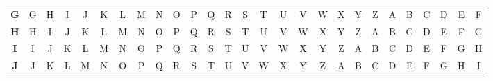 \documentclass{article}
\begin{document}
\begin{latin}
\begin{table}[H]
{\begin{tabular}{ccccccccccccccccccccccccccc}
\multicolumn{1}{c|}{\textbf{G}} & \multicolumn{1}{c|}{G} & \multicolumn{1}{c|}{H} & \multicolumn{1}{c|}{I} & \multicolumn{1}{c|}{J} & \multicolumn{1}{c|}{K} & \multicolumn{1}{c|}{L} & \multicolumn{1}{c|}{M} & \multicolumn{1}{c|}{N} & \multicolumn{1}{c|}{O} & \multicolumn{1}{c|}{P} & \multicolumn{1}{c|}{Q} & \multicolumn{1}{c|}{R} & \multicolumn{1}{c|}{S} & \multicolumn{1}{c|}{T} & \multicolumn{1}{c|}{U} & \multicolumn{1}{c|}{V} & \multicolumn{1}{c|}{W} & \multicolumn{1}{c|}{X} & \multicolumn{1}{c|}{Y} & \multicolumn{1}{c|}{Z} & \multicolumn{1}{c|}{A} & \multicolumn{1}{c|}{B} & \multicolumn{1}{c|}{C} & \multicolumn{1}{c|}{D} & \multicolumn{1}{c|}{E} & \multicolumn{1}{c|}{F} \\ \cline{2-27} 
\multicolumn{1}{c|}{\textbf{H}} & \multicolumn{1}{c|}{H} & \multicolumn{1}{c|}{I} & \multicolumn{1}{c|}{J} & \multicolumn{1}{c|}{K} & \multicolumn{1}{c|}{L} & \multicolumn{1}{c|}{M} & \multicolumn{1}{c|}{N} & \multicolumn{1}{c|}{O} & \multicolumn{1}{c|}{P} & \multicolumn{1}{c|}{Q} & \multicolumn{1}{c|}{R} & \multicolumn{1}{c|}{S} & \multicolumn{1}{c|}{T} & \multicolumn{1}{c|}{U} & \multicolumn{1}{c|}{V} & \multicolumn{1}{c|}{W} & \multicolumn{1}{c|}{X} & \multicolumn{1}{c|}{Y} & \multicolumn{1}{c|}{Z} & \multicolumn{1}{c|}{A} & \multicolumn{1}{c|}{B} & \multicolumn{1}{c|}{C} & \multicolumn{1}{c|}{D} & \multicolumn{1}{c|}{E} & \multicolumn{1}{c|}{F} & \multicolumn{1}{c|}{G} \\ \cline{2-27} 
\multicolumn{1}{c|}{\textbf{I}} & \multicolumn{1}{c|}{I} & \multicolumn{1}{c|}{J} & \multicolumn{1}{c|}{K} & \multicolumn{1}{c|}{L} & \multicolumn{1}{c|}{M} & \multicolumn{1}{c|}{N} & \multicolumn{1}{c|}{O} & \multicolumn{1}{c|}{P} & \multicolumn{1}{c|}{Q} & \multicolumn{1}{c|}{R} & \multicolumn{1}{c|}{S} & \multicolumn{1}{c|}{T} & \multicolumn{1}{c|}{U} & \multicolumn{1}{c|}{V} & \multicolumn{1}{c|}{W} & \multicolumn{1}{c|}{X} & \multicolumn{1}{c|}{Y} & \multicolumn{1}{c|}{Z} & \multicolumn{1}{c|}{A} & \multicolumn{1}{c|}{B} & \multicolumn{1}{c|}{C} & \multicolumn{1}{c|}{D} & \multicolumn{1}{c|}{E} & \multicolumn{1}{c|}{F} & \multicolumn{1}{c|}{G} & \multicolumn{1}{c|}{H} \\ \cline{2-27} 
\multicolumn{1}{c|}{\textbf{J}} & \multicolumn{1}{c|}{J} & \multicolumn{1}{c|}{K} & \multicolumn{1}{c|}{L} & \multicolumn{1}{c|}{M} & \multicolumn{1}{c|}{N} & \multicolumn{1}{c|}{O} & \multicolumn{1}{c|}{P} & \multicolumn{1}{c|}{Q} & \multicolumn{1}{c|}{R} & \multicolumn{1}{c|}{S} & \multicolumn{1}{c|}{T} & \multicolumn{1}{c|}{U} & \multicolumn{1}{c|}{V} & \multicolumn{1}{c|}{W} & \multicolumn{1}{c|}{X} & \multicolumn{1}{c|}{Y} & \multicolumn{1}{c|}{Z} & \multicolumn{1}{c|}{A} & \multicolumn{1}{c|}{B} & \multicolumn{1}{c|}{C} & \multicolumn{1}{c|}{D} & \multicolumn{1}{c|}{E} & \multicolumn{1}{c|}{F} & \multicolumn{1}{c|}{G} & \multicolumn{1}{c|}{H} & \multicolumn{1}{c|}{I} \\ \cline{2-27} 

\end{tabular}}
\end{table}
\end{latin}
\end{document}
